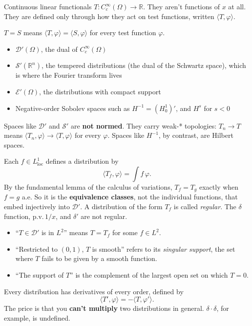 \documentclass[11pt]{article}
\newcommand{\R}{\mathbb{R}}
\newcommand{\D}{\mathcal{D}}
\newcommand{\Sch}{\mathcal{S}}
\newcommand{\E}{\mathcal{E}}
\newcommand{\Lloc}{L^1_{\mathrm{loc}}}
\newcommand{\Cc}{C_c^\infty}
\newcommand{\pair}[2]{\langle #1, #2 \rangle}
\begin{document}
\begin{description}[leftmargin=0pt]
  \item[What they are.] Continuous linear functionals $T:\Cc(\Omega)\to\R$.
    They aren't functions of $x$ at all. They are defined only through how they
    act on test functions, written $\pair{T}{\varphi}$.
  \item[Equality.] $T=S$ means $\pair{T}{\varphi}=\pair{S}{\varphi}$ for every
    test function $\varphi$.
  \item[Typical spaces.] \leavevmode
    \begin{itemize}
      \item $\D'(\Omega)$, the dual of $\Cc(\Omega)$
      \item $\Sch'(\R^n)$, the tempered distributions (the dual of the Schwartz
        space), which is where the Fourier transform lives
      \item $\E'(\Omega)$, the distributions with compact support
      \item Negative-order Sobolev spaces such as $H^{-1}=(H^1_0)'$, and $H^s$
        for $s<0$
    \end{itemize}
    Spaces like $\D'$ and $\Sch'$ are \textbf{not normed}. They carry weak-*
    topologies: $T_n\to T$ means $\pair{T_n}{\varphi}\to\pair{T}{\varphi}$ for
    every $\varphi$. Spaces like $H^{-1}$, by contrast, are Hilbert spaces.
  \item[How functions fit in.] Each $f\in\Lloc$ defines a distribution by
    \[
      \pair{T_f}{\varphi} = \int f\,\varphi .
    \]
    By the fundamental lemma of the calculus of variations, $T_f=T_g$ exactly
    when $f=g$ a.e. So it is the \textbf{equivalence classes}, not the
    individual functions, that embed injectively into $\D'$. A distribution of
    the form $T_f$ is called \emph{regular}. The $\delta$ function,
    $\mathrm{p.v.}\,1/x$, and $\delta'$ are not regular.
  \item[Language.] \leavevmode
    \begin{itemize}
      \item ``$T\in\D'$ is in $L^2$'' means $T=T_f$ for some $f\in L^2$.
      \item ``Restricted to $(0,1)$, $T$ is smooth'' refers to its
        \emph{singular support}, the set where $T$ fails to be given by a
        smooth function.
      \item ``The support of $T$'' is the complement of the largest open set
        on which $T=0$.
    \end{itemize}
  \item[Derivatives.] Every distribution has derivatives of every order,
    defined by
    \[
      \pair{T'}{\varphi} = -\pair{T}{\varphi'} .
    \]
    The price is that you \textbf{can't multiply} two distributions in general.
    $\delta\cdot\delta$, for example, is undefined.
\end{description}
\end{document}
